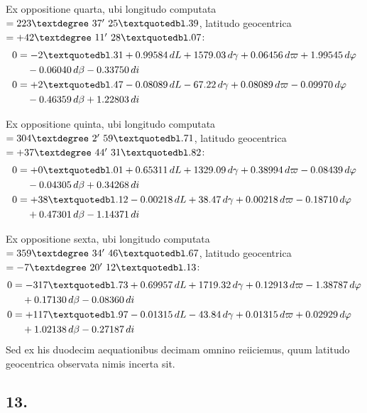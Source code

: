 \documentclass[12pt,a4paper]{article}
\begin{document}
Ex oppositione quarta, ubi longitudo computata $= 223\textdegree\ 37'\ 25\textquotedbl.39$,
latitudo geocentrica $= +42\textdegree\ 11'\ 28\textquotedbl.07$:
\begin{align*}
0 &= -2\textquotedbl.31 + 0.99584\,dL + 1579.03\,d\gamma + 0.06456\,d\varpi + 1.99545\,d\varphi \\
&\quad - 0.06040\,d\beta - 0.33750\,di \\
0 &= +2\textquotedbl.47 - 0.08089\,dL - 67.22\,d\gamma + 0.08089\,d\varpi - 0.09970\,d\varphi \\
&\quad - 0.46359\,d\beta + 1.22803\,di
\end{align*}

Ex oppositione quinta, ubi longitudo computata $= 304\textdegree\ 2'\ 59\textquotedbl.71$,
latitudo geocentrica $= +37\textdegree\ 44'\ 31\textquotedbl.82$:
\begin{align*}
0 &= +0\textquotedbl.01 + 0.65311\,dL + 1329.09\,d\gamma + 0.38994\,d\varpi - 0.08439\,d\varphi \\
&\quad - 0.04305\,d\beta + 0.34268\,di \\
0 &= +38\textquotedbl.12 - 0.00218\,dL + 38.47\,d\gamma + 0.00218\,d\varpi - 0.18710\,d\varphi \\
&\quad + 0.47301\,d\beta - 1.14371\,di
\end{align*}

Ex oppositione sexta, ubi longitudo computata $= 359\textdegree\ 34'\ 46\textquotedbl.67$,
latitudo geocentrica $= -7\textdegree\ 20'\ 12\textquotedbl.13$:
\begin{align*}
0 &= -317\textquotedbl.73 + 0.69957\,dL + 1719.32\,d\gamma + 0.12913\,d\varpi - 1.38787\,d\varphi \\
&\quad + 0.17130\,d\beta - 0.08360\,di \\
0 &= +117\textquotedbl.97 - 0.01315\,dL - 43.84\,d\gamma + 0.01315\,d\varpi + 0.02929\,d\varphi \\
&\quad + 1.02138\,d\beta - 0.27187\,di
\end{align*}
Sed ex his duodecim aequationibus decimam omnino reiiciemus, quum latitudo
geocentrica observata nimis incerta sit.

\subsection*{13.}
\end{document}
